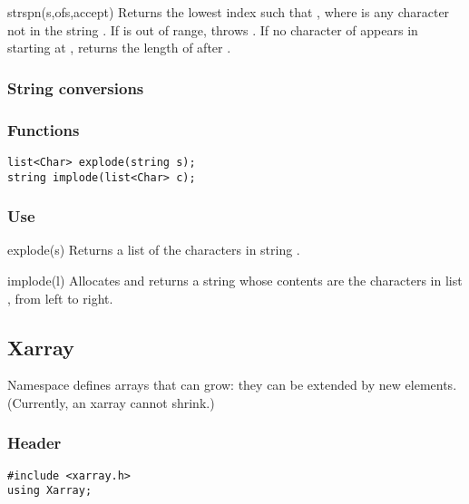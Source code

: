 \begin{defun}{strspn}{(s,ofs,accept)}
Returns the lowest index  such that
, where  is any character not
in the string .  If  is out of range, 
throws .  If no character of
 appears in  starting at , 
returns the length of  after .
\end{defun}


\subsubsection*{String conversions}
\subsubsection*{Functions}
\begin{verbatim}
list<Char> explode(string s);
string implode(list<Char> c);
\end{verbatim}

\subsubsection*{Use}

\begin{defun}{explode}{(s)}
Returns a list of the characters in string .
\end{defun}

\begin{defun}{implode}{(l)}
Allocates and returns a string whose contents are the characters in list
, from left to right.
\end{defun}

\subsection{Xarray}

Namespace  defines arrays that can grow: they can be
extended by new elements.  (Currently, an xarray cannot shrink.)

\subsubsection*{Header}
\begin{verbatim}
#include <xarray.h>
using Xarray;
\end{verbatim}

